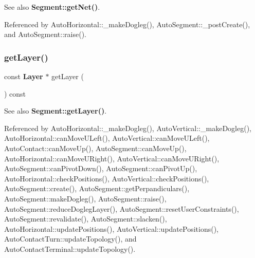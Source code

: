 \begin{DoxySeeAlso}{See also}
\textbf{ Segment\+::get\+Net()}. 
\end{DoxySeeAlso}


Referenced by Auto\+Horizontal\+::\+\_\+make\+Dogleg(), Auto\+Segment\+::\+\_\+post\+Create(), and Auto\+Segment\+::raise().

\mbox{\label{classKatabatic_1_1AutoSegment_ab045567c4f529dca7790d66c17c3084f}} 
\subsubsection{\texorpdfstring{get\+Layer()}{getLayer()}}
{\footnotesize\ttfamily const \textbf{ Layer} $\ast$ get\+Layer (\begin{DoxyParamCaption}{ }\end{DoxyParamCaption}) const\hspace{0.3cm}{\ttfamily [inline]}}

\begin{DoxySeeAlso}{See also}
\textbf{ Segment\+::get\+Layer()}. 
\end{DoxySeeAlso}


Referenced by Auto\+Horizontal\+::\+\_\+make\+Dogleg(), Auto\+Vertical\+::\+\_\+make\+Dogleg(), Auto\+Horizontal\+::can\+Move\+U\+Left(), Auto\+Vertical\+::can\+Move\+U\+Left(), Auto\+Contact\+::can\+Move\+Up(), Auto\+Segment\+::can\+Move\+Up(), Auto\+Horizontal\+::can\+Move\+U\+Right(), Auto\+Vertical\+::can\+Move\+U\+Right(), Auto\+Segment\+::can\+Pivot\+Down(), Auto\+Segment\+::can\+Pivot\+Up(), Auto\+Horizontal\+::check\+Positions(), Auto\+Vertical\+::check\+Positions(), Auto\+Segment\+::create(), Auto\+Segment\+::get\+Perpandiculars(), Auto\+Segment\+::make\+Dogleg(), Auto\+Segment\+::raise(), Auto\+Segment\+::reduce\+Dogleg\+Layer(), Auto\+Segment\+::reset\+User\+Constraints(), Auto\+Segment\+::revalidate(), Auto\+Segment\+::slacken(), Auto\+Horizontal\+::update\+Positions(), Auto\+Vertical\+::update\+Positions(), Auto\+Contact\+Turn\+::update\+Topology(), and Auto\+Contact\+Terminal\+::update\+Topology().

\mbox{\label{classKatabatic_1_1AutoSegment_a63a3ab1e6501bbad68b9efd4998e48c0}} 
